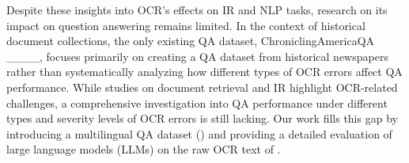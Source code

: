 Despite these insights into OCR's effects on IR and NLP tasks, research on its impact on question answering remains limited. In the context of historical document collections, the only existing QA dataset, ChroniclingAmericaQA ____, focuses primarily on creating a QA dataset from historical newspapers rather than systematically analyzing how different types of OCR errors affect QA performance. While studies on document retrieval and IR highlight OCR-related challenges, a comprehensive investigation into QA performance under different types and severity levels of OCR errors is still lacking. Our work fills this gap by introducing a multilingual QA dataset (\MultiOCR) and providing a detailed evaluation of large language models (LLMs) on the raw OCR text of \MultiOCR.

 

 
